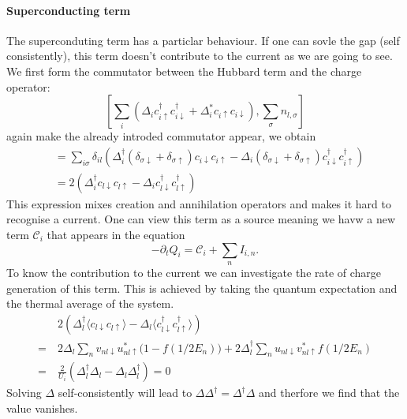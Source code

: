 \documentclass[../main.tex]{subfile}
\begin{document}
\paragraph{Superconducting term} The superconduting term has a particlar behaviour. If one can sovle the gap (self consistently), this term 
doesn't contribute to the current as we are going to see. We first form the commutator between the Hubbard term and the charge operator:
\begin{equation*}
        \left[\sum_i\left(\Delta_i c_{i\uparrow}^{\dagger}c_{i\downarrow}^{\dagger} + 
        \Delta_i^{\ast} c_{i\uparrow}c_{i\downarrow}\right) , \sum_{\sigma} n_{l,\sigma}\right]
\end{equation*}
again make the already introded commutator appear, we obtain
\begin{equation*}
    \begin{aligned}
    &= \sum_{i\sigma} \delta_{il}\left(\Delta_i^{\dagger} (\delta_{\sigma\downarrow} + \delta_{\sigma\uparrow})c_{i\downarrow}c_{i\uparrow} 
    -\Delta_i(\delta_{\sigma\downarrow} + \delta_{\sigma\uparrow})c_{i\downarrow}^{\dagger} c_{i\uparrow}^{\dagger}\right)\\
    &= 2 \left( \Delta_i^{\dagger} c_{l\downarrow}c_{l\uparrow} - \Delta_i c_{l\downarrow}^{\dagger}c_{l\uparrow}^{\dagger}\right)
    \end{aligned}
\end{equation*}
This expression mixes creation and annihilation operators and makes it hard to recognise a current. One can view this term as a 
source meaning we havw a new term $\mathcal{C}_i$ that appears in the equation  
\[
    -\partial_t Q_i = \mathcal{C}_i +  \sum_n I_{i,n}  .
\]
To know the contribution to the current we can investigate the rate of charge generation of this term. This is achieved by taking the quantum
expectation and the thermal average of the system.
\begin{align*}
    &~2\left(\Delta_l^{\dagger}\langle c_{l\downarrow}c_{l\uparrow}\rangle - \Delta_l\langle c_{l\downarrow}^{\dagger}c_{l\uparrow}^{\dagger}\rangle\right)\\
    =&~ 2 \Delta_l \sum_{n} v_{nl\downarrow}u_{nl\uparrow}^{\ast} \bigl(1-f\left(1/2 E_n\right)\bigr) + 2 \Delta_l^{\dagger} \sum_{n} u_{nl\downarrow}v_{nl\uparrow}^{\ast} f\left(1/2 E_n\right)\\
    =& ~ \frac{2}{U_i}\left(\Delta_l^{\dagger}\Delta_l -\Delta_l \Delta_l^{\dagger} \right) = 0
\end{align*}
Solving $\Delta$ self-consistently will lead to $\Delta\Delta^{\dagger} = \Delta^{\dagger}\Delta$ and therfore we find that the value vanishes.
\end{document}
